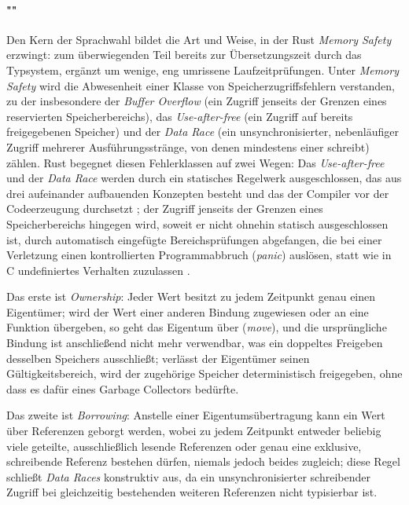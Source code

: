 \paragraph{""}
Den Kern der Sprachwahl bildet die Art und Weise, in der Rust \textit{Memory Safety} erzwingt: zum überwiegenden
Teil bereits zur Übersetzungszeit durch das Typsystem, ergänzt um wenige, eng umrissene Laufzeitprüfungen. Unter
\textit{Memory Safety} wird die Abwesenheit einer
Klasse von Speicherzugriffsfehlern verstanden, zu der insbesondere der \textit{Buffer Overflow} (ein Zugriff
jenseits der Grenzen eines reservierten Speicherbereichs), das \textit{Use-after-free} (ein Zugriff auf bereits
freigegebenen Speicher) und der \textit{Data Race} (ein unsynchronisierter, nebenläufiger Zugriff mehrerer
Ausführungsstränge, von denen mindestens einer schreibt) zählen. Rust begegnet diesen Fehlerklassen auf zwei Wegen:
Das \textit{Use-after-free} und der \textit{Data Race} werden durch ein statisches Regelwerk ausgeschlossen, das aus
drei aufeinander aufbauenden Konzepten besteht und das der Compiler vor der Codeerzeugung durchsetzt
\cite{rust-book,rust-reference}; der Zugriff jenseits der Grenzen eines Speicherbereichs hingegen wird, soweit er
nicht ohnehin statisch ausgeschlossen ist, durch automatisch eingefügte Bereichsprüfungen abgefangen, die bei einer
Verletzung einen kontrollierten Programmabbruch (\textit{panic}) auslösen, statt wie in C undefiniertes Verhalten
zuzulassen \cite[Kap.~9]{rust-book}.

Das erste ist \textit{Ownership}: Jeder Wert besitzt zu jedem Zeitpunkt genau einen Eigentümer; wird der
Wert einer anderen Bindung zugewiesen oder an eine Funktion übergeben, so geht das Eigentum über
(\textit{move}), und die ursprüngliche Bindung ist anschließend nicht mehr verwendbar, was ein doppeltes
Freigeben desselben Speichers ausschließt; verlässt der Eigentümer seinen Gültigkeitsbereich, wird der
zugehörige Speicher deterministisch freigegeben, ohne dass es dafür eines Garbage Collectors bedürfte.

Das zweite ist \textit{Borrowing}: Anstelle einer Eigentumsübertragung kann ein Wert über Referenzen
geborgt werden, wobei zu jedem Zeitpunkt entweder beliebig viele geteilte, ausschließlich lesende
Referenzen oder genau eine exklusive, schreibende Referenz bestehen dürfen, niemals jedoch beides
zugleich; diese Regel schließt \textit{Data Races} konstruktiv aus, da ein unsynchronisierter
schreibender Zugriff bei gleichzeitig bestehenden weiteren Referenzen nicht typisierbar ist.

